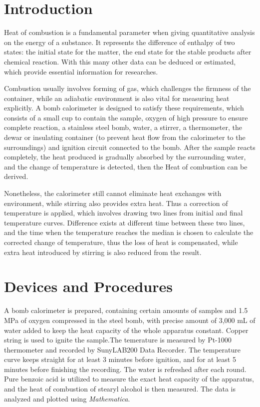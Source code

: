 \documentclass[%
 reprint,
 amsmath,amssymb,
 aps,
10.5pt,
]{revtex4-1}
\begin{document}
\tableofcontents

\section{Introduction}
Heat of combustion is a fundamental parameter when giving quantitative analysis on the energy of a substance. It represents the difference of enthalpy of two states: the initial state for the matter, the end state for the stable products after chemical reaction. With this many other data can be deduced or estimated, which provide essential information for researches.

Combustion usually involves forming of gas, which challenges the firmness of the container, while an adiabatic environment is also vital for measuring heat explicitly. A bomb calorimeter is designed to satisfy these requirements, which consists of a small cup to contain the sample, oxygen of high pressure to ensure complete reaction, a stainless steel bomb, water, a stirrer, a thermometer, the dewar or insulating container (to prevent heat flow from the calorimeter to the surroundings) and ignition circuit connected to the bomb. After the sample reacts completely, the heat produced is gradually absorbed by the surrounding water, and the change of temperature is detected, then the Heat of combustion can be derived. 

Nonetheless, the calorimeter still cannot eliminate heat exchanges with environment, while stirring also provides extra heat. Thus a correction of temperature is applied, which involves drawing two lines from initial and final temperature curves. Difference exists at different time between these two lines, and the time when the temperature reaches the median is chosen to calculate the corrected change of temperature, thus the loss of heat is compensated, while extra heat introduced by stirring is also reduced from the result.

\section{Devices and Procedures}
A bomb calorimeter is prepared, containing certain amounts of samples and 1.5 MPa of oxygen compressed in the steel bomb, with precise amount of 3,000 mL of water added to keep the heat capacity of the whole apparatus constant. Copper string is used to ignite the sample.The temerature is measured by Pt-1000 thermometer and recorded by SunyLAB200 Data Recorder. The temperature curve keeps straight for at least 3 minutes before ignition, and for at least 5 minutes before finishing the recording. The water is refreshed after each round. Pure benzoic acid is utilized to measure the exact heat capacity of the apparatus, and the heat of combustion of stearyl alcohol is then measured. The data is analyzed and plotted using \emph{Mathematica}.
\end{document}
